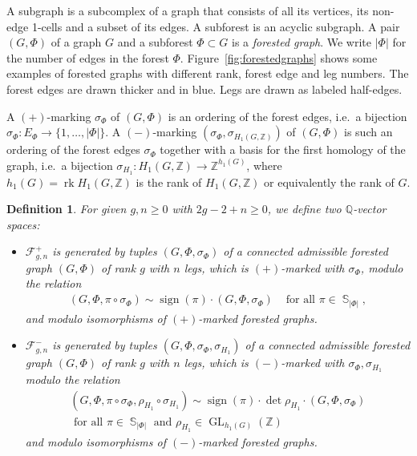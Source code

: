 \documentclass[oneside]{amsart}
\newtheorem{definition}[theorem]{Definition}
\theoremstyle{remark}
\newcommand{\Q}{\mathbb{Q}}
\newcommand{\Z}{\mathbb{Z}}
\DeclareMathOperator{\SG}{{\mathbb S}}
\newcommand{\GL}{{\operatorname{GL}}}
\newcommand{\sign}{{\operatorname{sign}}}
\DeclareMathOperator{\rank}{\mathrm{rk}}
\newcommand{\F}{\mathcal{F}}
\begin{document}
%

%
%
%
%
%
%
%
A subgraph is a subcomplex of a graph that consists of all its vertices, its non-edge 1-cells and a subset of its edges.
A subforest is an acyclic subgraph. A pair $(G,\Phi)$ of a graph $G$ and a subforest $\Phi \subset G$ is 
a \emph{forested graph}.
We write $|\Phi|$ for the number of edges in the forest $\Phi$.
Figure~\ref{fig:forestedgraphs} shows some examples of forested graphs with different rank, forest edge and leg numbers.
The forest edges are drawn thicker and in blue. Legs are drawn as labeled half-edges.
%

%
%
%
%
%
A $(+)$-marking $\sigma_\Phi$ of $(G,\Phi)$ is an ordering of the forest edges, i.e.~a bijection $\sigma_\Phi: E_\Phi \rightarrow \{1,\ldots,|\Phi|\}$.
A $(-)$-marking $(\sigma_\Phi,\sigma_{H_1(G,\Z)})$ of $(G,\Phi)$ is such an ordering of the forest edges $\sigma_\Phi$
together with a basis for the first homology of the graph, i.e.~a bijection
$\sigma_{H_1}:H_1(G,\Z) \rightarrow \Z^{h_1(G)}$, where $h_1(G) = \rank H_1(G,\Z)$ is the rank of $H_1(G,\Z)$ or equivalently the rank of $G$.
\begin{definition}
\label{def:fgc}
For given $g,n \geq 0$ with $2g-2+n \geq 0$, we define two $\Q$-vector spaces:
%
\begin{itemize}
\item
$\F_{g,n}^{+}$ is generated by tuples $(G,\Phi,\sigma_\Phi)$ of a connected admissible forested graph $(G,\Phi)$ of rank $g$ with $n$ legs,
which is 
$(+)$-marked with $\sigma_\Phi$, modulo the relation
\begin{align*} (G,\Phi,\pi \circ \sigma_\Phi) \sim \sign(\pi) \cdot (G,\Phi,\sigma_\Phi) & \text{ for all } \pi \in \SG_{|\Phi|}, \end{align*}
and modulo isomorphisms of $(+)$-marked forested graphs.
\item
$\F_{g,n}^{-}$ is generated by tuples $(G,\Phi,\sigma_\Phi,\sigma_{H_1})$ of a connected admissible forested graph $(G,\Phi)$ of rank $g$ with $n$ legs,
which is
$(-)$-marked with $\sigma_\Phi,\sigma_{H_1}$ modulo the relation
\begin{gather*} (G,\Phi,\pi \circ \sigma_\Phi, \rho_{H_1} \circ \sigma_{H_1}) \sim \sign(\pi) \cdot \det \rho_{H_1}\cdot (G,\Phi,\sigma_\Phi) \\
 \text{ for all } \pi \in \SG_{|\Phi|} \text{ and } \rho_{H_1} \in \GL_{h_1(G)}(\Z) \end{gather*}
and modulo isomorphisms of $(-)$-marked forested graphs.
\end{itemize}
\end{definition}
\end{document}
